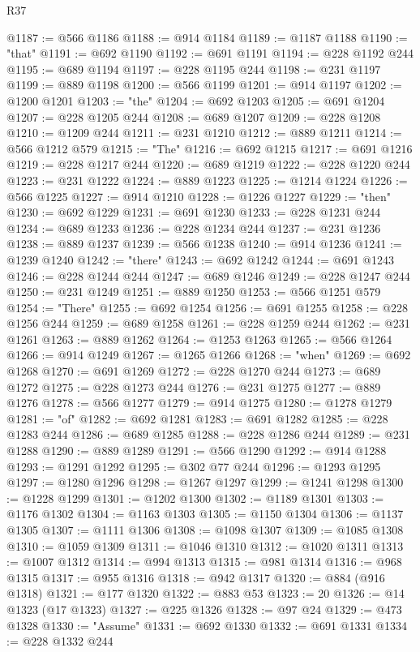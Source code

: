 \begin{lexlean}{R37}
\begin{coremodule}
@1187 := @566 @1186
@1188 := @914 @1184
@1189 := @1187 @1188
@1190 := "that"
@1191 := @692 @1190
@1192 := @691 @1191
@1194 := @228 @1192 @244
@1195 := @689 @1194
@1197 := @228 @1195 @244
@1198 := @231 @1197
@1199 := @889 @1198
@1200 := @566 @1199
@1201 := @914 @1197
@1202 := @1200 @1201
@1203 := "the"
@1204 := @692 @1203
@1205 := @691 @1204
@1207 := @228 @1205 @244
@1208 := @689 @1207
@1209 := @228 @1208
@1210 := @1209 @244
@1211 := @231 @1210
@1212 := @889 @1211
@1214 := @566 @1212 @579
@1215 := "The"
@1216 := @692 @1215
@1217 := @691 @1216
@1219 := @228 @1217 @244
@1220 := @689 @1219
@1222 := @228 @1220 @244
@1223 := @231 @1222
@1224 := @889 @1223
@1225 := @1214 @1224
@1226 := @566 @1225
@1227 := @914 @1210
@1228 := @1226 @1227
@1229 := "then"
@1230 := @692 @1229
@1231 := @691 @1230
@1233 := @228 @1231 @244
@1234 := @689 @1233
@1236 := @228 @1234 @244
@1237 := @231 @1236
@1238 := @889 @1237
@1239 := @566 @1238
@1240 := @914 @1236
@1241 := @1239 @1240
@1242 := "there"
@1243 := @692 @1242
@1244 := @691 @1243
@1246 := @228 @1244 @244
@1247 := @689 @1246
@1249 := @228 @1247 @244
@1250 := @231 @1249
@1251 := @889 @1250
@1253 := @566 @1251 @579
@1254 := "There"
@1255 := @692 @1254
@1256 := @691 @1255
@1258 := @228 @1256 @244
@1259 := @689 @1258
@1261 := @228 @1259 @244
@1262 := @231 @1261
@1263 := @889 @1262
@1264 := @1253 @1263
@1265 := @566 @1264
@1266 := @914 @1249
@1267 := @1265 @1266
@1268 := "when"
@1269 := @692 @1268
@1270 := @691 @1269
@1272 := @228 @1270 @244
@1273 := @689 @1272
@1275 := @228 @1273 @244
@1276 := @231 @1275
@1277 := @889 @1276
@1278 := @566 @1277
@1279 := @914 @1275
@1280 := @1278 @1279
@1281 := "of"
@1282 := @692 @1281
@1283 := @691 @1282
@1285 := @228 @1283 @244
@1286 := @689 @1285
@1288 := @228 @1286 @244
@1289 := @231 @1288
@1290 := @889 @1289
@1291 := @566 @1290
@1292 := @914 @1288
@1293 := @1291 @1292
@1295 := @302 @77 @244
@1296 := @1293 @1295
@1297 := @1280 @1296
@1298 := @1267 @1297
@1299 := @1241 @1298
@1300 := @1228 @1299
@1301 := @1202 @1300
@1302 := @1189 @1301
@1303 := @1176 @1302
@1304 := @1163 @1303
@1305 := @1150 @1304
@1306 := @1137 @1305
@1307 := @1111 @1306
@1308 := @1098 @1307
@1309 := @1085 @1308
@1310 := @1059 @1309
@1311 := @1046 @1310
@1312 := @1020 @1311
@1313 := @1007 @1312
@1314 := @994 @1313
@1315 := @981 @1314
@1316 := @968 @1315
@1317 := @955 @1316
@1318 := @942 @1317
@1320 := @884 (@916 @1318)
@1321 := @177 @1320
@1322 := @883 @53
@1323 := 20
@1326 := @14 @1323 (@17 @1323)
@1327 := @225 @1326
@1328 := @97 @24
@1329 := @473 @1328
@1330 := "Assume"
@1331 := @692 @1330
@1332 := @691 @1331
@1334 := @228 @1332 @244

\end{coremodule}
\end{lexlean}

